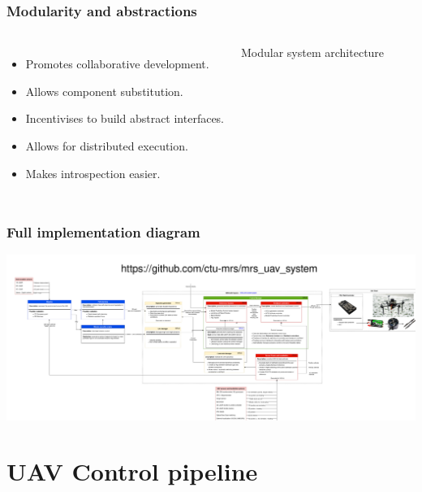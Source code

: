 \documentclass[aspectratio=169]{beamer}
\begin{document}
\begin{frame}
\frametitle{Modularity and abstractions}

\begin{columns}[c]


\begin{itemize}
  \item Promotes collaborative development.
  \item Allows component substitution.
  \item Incentivises to build abstract interfaces.
  \item Allows for distributed execution.
  \item Makes introspection easier.
\end{itemize}


\begin{block}{Modular system architecture}
  \begin{adjustbox}{max totalsize={1.0\textwidth}{.65\textheight}, center}
    
  \end{adjustbox}
\end{block}

\end{columns}

\end{frame}

\begin{frame}
\frametitle{Full implementation diagram}

  \includegraphics[width=1.0\textwidth]{./fig/full_diagram.jpg}

\end{frame}



\section{UAV Control pipeline}
\end{document}
